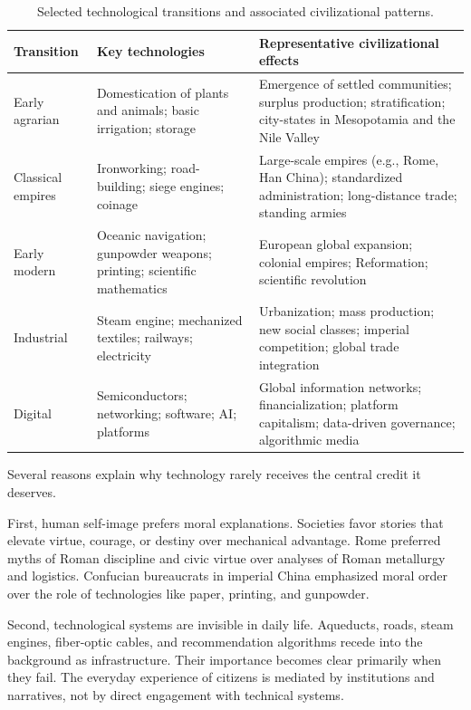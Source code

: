 \documentclass[12pt,letterpaper]{article}
\begin{document}
\begin{table}[!htbp]
\centering
\caption{Selected technological transitions and associated civilizational patterns.}
\label{tab:transitions}
\begin{tabularx}{\textwidth}{@{}P{2.35cm}P{4.55cm}L@{}}
\toprule
\textbf{Transition} & \textbf{Key technologies} & \textbf{Representative civilizational effects} \\
\midrule
Early agrarian & Domestication of plants and animals; basic irrigation; storage & Emergence of settled communities; surplus production; stratification; city-states in Mesopotamia and the Nile Valley \\[0.4em]
Classical empires & Ironworking; road-building; siege engines; coinage & Large-scale empires (e.g., Rome, Han China); standardized administration; long-distance trade; standing armies \\[0.4em]
Early modern & Oceanic navigation; gunpowder weapons; printing; scientific mathematics & European global expansion; colonial empires; Reformation; scientific revolution \\[0.4em]
Industrial & Steam engine; mechanized textiles; railways; electricity & Urbanization; mass production; new social classes; imperial competition; global trade integration \\[0.4em]
Digital & Semiconductors; networking; software; AI; platforms & Global information networks; financialization; platform capitalism; data-driven governance; algorithmic media \\
\bottomrule
\end{tabularx}
\end{table}

Several reasons explain why technology rarely receives the central credit it deserves.

First, human self-image prefers moral explanations. Societies favor stories that elevate virtue, courage, or destiny over mechanical advantage. Rome preferred myths of Roman discipline and civic virtue over analyses of Roman metallurgy and logistics. Confucian bureaucrats in imperial China emphasized moral order over the role of technologies like paper, printing, and gunpowder.

Second, technological systems are invisible in daily life. Aqueducts, roads, steam engines, fiber-optic cables, and recommendation algorithms recede into the background as infrastructure. Their importance becomes clear primarily when they fail. The everyday experience of citizens is mediated by institutions and narratives, not by direct engagement with technical systems.
\end{document}
